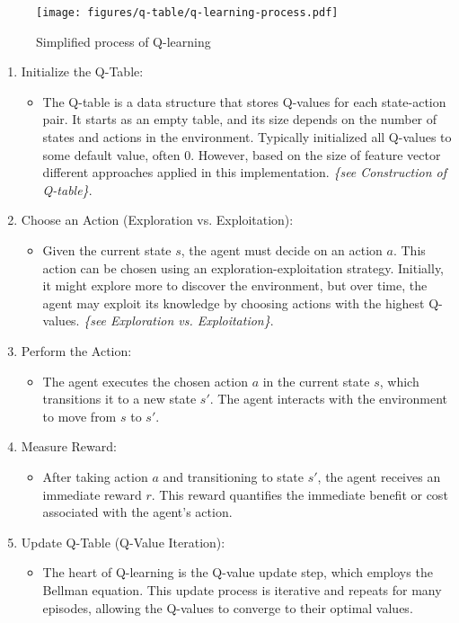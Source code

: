 \documentclass{article}
\begin{document}
\begin{figure}[h]
    \centering
    \texttt{[image: figures/q-table/q-learning-process.pdf]}
    \caption{Simplified process of Q-learning }
    \label{fig:q-learning-process}
\end{figure}


\begin{enumerate}
    \item Initialize the Q-Table:
    \begin{itemize}
        \item The Q-table is a data structure that stores Q-values for each state-action pair. It starts as an empty table, and its size depends on the number of states and actions in the environment. Typically initialized all Q-values to some default value, often 0. However, based on the size of feature vector different approaches applied in this implementation. \textit{\{see Construction of Q-table\}}.
    \end{itemize}
    \item Choose an Action (Exploration vs. Exploitation):
    \begin{itemize}
        \item Given the current state $s$, the agent must decide on an action $a$. This action can be chosen using an exploration-exploitation strategy. Initially, it might explore more to discover the environment, but over time, the agent may exploit its knowledge by choosing actions with the highest Q-values. \textit{\{see Exploration vs. Exploitation\}}.
    \end{itemize}
    \item Perform the Action:
    \begin{itemize}
        \item The agent executes the chosen action $a$ in the current state $s$, which transitions it to a new state $s'$. The agent interacts with the environment to move from $s$ to $s'$.
    \end{itemize}
    \item Measure Reward:
    \begin{itemize}
        \item After taking action $a$ and transitioning to state $s'$, the agent receives an immediate reward $r$. This reward quantifies the immediate benefit or cost associated with the agent's action.
    \end{itemize}
    \item Update Q-Table (Q-Value Iteration):
    \begin{itemize}
        \item The heart of Q-learning is the Q-value update step, which employs the Bellman equation. This update process is iterative and repeats for many episodes, allowing the Q-values to converge to their optimal values.
    \end{itemize}
\end{enumerate}
\end{document}
